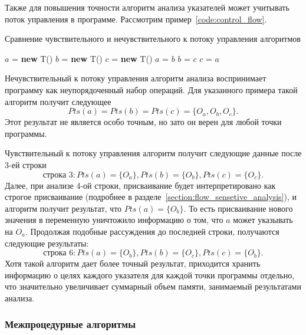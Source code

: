 \documentclass[14pt,titlepage]{extarticle}
\newcommand{\NEW}{\textbf{new }}
\begin{document}
        Также для повышения точности алгоритм анализа указателей может
        учитывать поток управления в программе.
        Рассмотрим пример~\ref{code:control_flow}.
        \begin{algorithm}
          \caption{Сравнение чувствительного и нечувствительного к потоку
                   управления алгоритмов}
          \label{code:control_flow}
          \begin{algorithmic}[1]
            \STATE $a$ = \NEW T()
            \STATE $b$ = \NEW T()
            \STATE $c$ = \NEW T()
            \STATE $a$ = $b$
            \STATE $b$ = $c$
            \STATE $c$ = $a$
          \end{algorithmic}
        \end{algorithm}

        Нечувствительный к потоку управления алгоритм анализа воспринимает
        программу как неупорядоченный набор операций.
        Для указанного примера такой алгоритм получит следующее
        \[Pts(a) = Pts(b) = Pts(c) = \{O_a, O_b, O_c\}.\]
        Этот результат не является особо точным, но зато он верен
        для любой точки программы.

        Чувствительный к потоку управления алгоритм получит следующие данные
        после 3-ей строки
        \[\textrm{строка 3}:
            Pts(a) = \{O_a\}, Pts(b) = \{O_b\}, Pts(c) = \{O_c\}.\]
        Далее, при анализе 4-ой строки, присваивание будет интерпретировано
        как строгое присваивание (подробнее в
        разделе~\ref{section:flow_sensetive_analysis}), и алгоритм получит
        результат, что $Pts(a) = \{O_b\}$. То есть присваивание нового значения
        в переменную уничтожило информацию о том, что $a$ может указывать на
        $O_a$. Продолжая подобные рассуждения до последней строки, получаются
        следующие результаты:
        \[\textrm{строка 6}:
            Pts(a) = \{O_b\}, Pts(b) = \{O_c\}, Pts(c) = \{O_b\}.\]
        Хотя такой алгоритм дает более точный результат, приходится хранить
        информацию о целях каждого указателя для каждой точки программы
        отдельно, что значительно увеличивает суммарный объем памяти,
        занимаемый результатами анализа.

      \subsubsection{Межпроцедурные алгоритмы}
\end{document}
